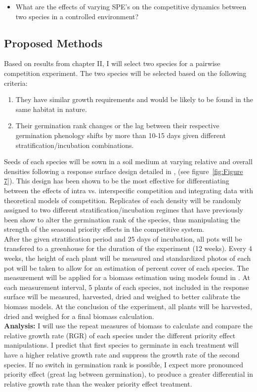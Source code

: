 \documentclass{article}\usepackage[]{graphicx}\usepackage[]{color}
\begin{document}
\begin{itemize}
\item What are the effects of varying SPE's on the competitive dynamics between two species in a controlled environment?
\end{itemize}
\subsection*{Proposed Methods}
\indent\indent Based on results from chapter II, I will select two species for a pairwise competition experiment. The two species will be selected based on the following criteria:
\begin{enumerate}
\item They have similar growth requirements and would be likely to be found in the same habitat in nature.
\item Their germination rank changes or the lag between their respective germination phenology shifts by more than 10-15 days given different stratification/incubation combinations.
\end{enumerate}
\indent\indent Seeds of each species will be sown in a soil medium at varying relative and overall densities following a response surface design detailed in \cite{Inouye2001}, (see figure~\ref{fig:Figure 7}). This design has been shown to be the most effective for differentiating between the effects of intra vs. interspecific competition and integrating data with theoretical models of competition.  Replicates of each density will be randomly assigned to two different stratification/incubation regimes that have previously been show to alter the germination rank of the species, thus manipulating the strength of the seasonal priority effects in the competitive system.\\
\indent After the given stratification period and 25 days of incubation, all pots will be transfered to a greenhouse for the duration of the experiment (12 weeks). Every 4 weeks, the height of each plant will be measured and standardized photos of each pot will be taken to allow for an estimation of percent cover of each species. The measurement will be applied for a biomass estimation using models found in \citet{Axmanova2012}. At each measurement interval, 5 plants of each species, not included in the response surface will be measured, harvested, dried and weighed to better calibrate the biomass models. At the conclusion of the experiment, all plants will be harvested, dried and weighed for a final biomass calculation.\\
\indent\textbf{Analysis:} I will use the repeat measures of biomass to calculate and compare the relative growth rate (RGR) \citep{Connolly2005} of each species under the different priority effect manipulations. I predict that first species to germinate in each treatment will have a higher relative growth rate and suppress the growth rate of the second species. If no switch in germination rank is possible, I expect more pronounced priority effect (great lag between germination), to produce a greater differential in relative growth rate than the weaker priority effect treatment.\\  
\end{document}
